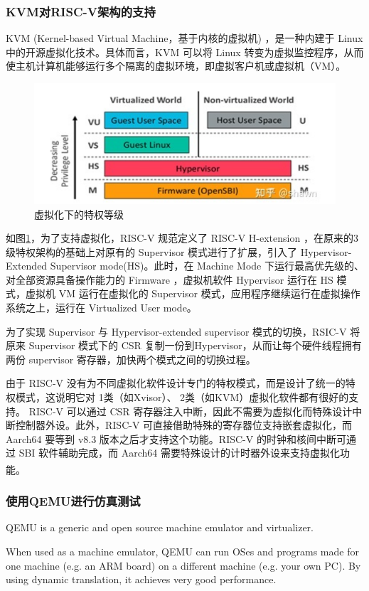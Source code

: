 \documentclass[UTF8,fontset=none,linespread=1.15]{ctexart}
\let\nosupcite\cite
\renewcommand*{\cite}[1]{\textsuperscript{\nosupcite{#1}}}
\begin{document}
\subsubsection{KVM对RISC-V架构的支持}
KVM (Kernel-based Virtual Machine，基于内核的虚拟机)  ，是一种内建于 Linux 中的开源虚拟化技术。具体而言，KVM 可以将 Linux 转变为虚拟监控程序，从而使主机计算机能够运行多个隔离的虚拟环境，即虚拟客户机或虚拟机（VM）。
\begin{figure}[!hbt]
	\centering
	\includegraphics[width=0.7\linewidth]{assets/W4}
	\caption{虚拟化下的特权等级}
	\label{fig:w4}
\end{figure}

如图\ref{fig:w4}，为了支持虚拟化，RISC-V 规范定义了 RISC-V H-extension ，在原来的3级特权架构的基础上对原有的 Supervisor 模式进行了扩展，引入了 Hypervisor-Extended Supervisor mode(HS)。此时，在 Machine Mode 下运行最高优先级的、对全部资源具备操作能力的 Firmware ，虚拟机软件 Hypervisor 运行在 HS 模式，虚拟机 VM 运行在虚拟化的 Supervisor 模式，应用程序继续运行在虚拟操作系统之上，运行在 Virtualized User mode。

为了实现 Supervisor 与 Hypervisor-extended supervisor 模式的切换，RSIC-V 将原来 Supervisor 模式下的 CSR 复制一份到Hypervisor，从而让每个硬件线程拥有两份 supervisor 寄存器，加快两个模式之间的切换过程。

由于 RISC-V 没有为不同虚拟化软件设计专门的特权模式，而是设计了统一的特权模式，这说明它对 1类（如Xvisor）、 2类（如KVM）虚拟化软件都有很好的支持。 RISC-V 可以通过 CSR 寄存器注入中断，因此不需要为虚拟化而特殊设计中断控制器外设。此外，RISC-V 可直接借助特殊的寄存器位支持嵌套虚拟化，而 Aarch64 要等到 v8.3 版本之后才支持这个功能。RISC-V 的时钟和核间中断可通过 SBI 软件辅助完成，而 Aarch64 需要特殊设计的计时器外设来支持虚拟化功能。\cite{d}

\subsubsection{使用QEMU进行仿真测试}

QEMU is a generic and open source machine emulator and virtualizer.

When used as a machine emulator, QEMU can run OSes and programs made for one machine (e.g. an ARM board) on a different machine (e.g. your own PC). By using dynamic translation, it achieves very good performance.
\end{document}
